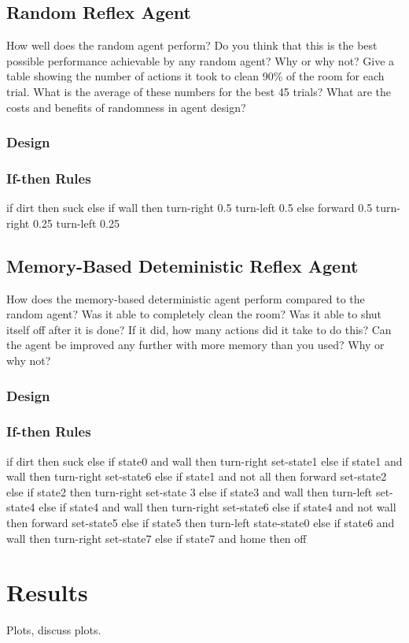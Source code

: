 \documentclass[a4paper,10pt]{article}
\begin{document}
\subsection{Random Reflex Agent}
How well does the random agent perform? Do you think that this is the best possible performance achievable by any random agent? Why or why not? Give a table showing the number of actions it took to clean 90\% of the room for each trial. What is the average of these numbers for the best 45 trials? What are the costs and benefits of randomness in agent design?
\subsubsection{Design}
\subsubsection{If-then Rules}
if dirt then suck
else if wall then turn-right 0.5 turn-left 0.5
else forward 0.5 turn-right 0.25 turn-left 0.25


\subsection{Memory-Based Deteministic Reflex Agent}
How does the memory-based deterministic agent perform compared to the random agent? Was it able to completely clean the room? Was it able to shut itself off after it is done? If it did, how many actions did it take to do this? Can the agent be improved any further with more memory than you used? Why or why not?
\subsubsection{Design}
\subsubsection{If-then Rules}
if dirt then suck
else if state0 and wall then turn-right set-state1
else if state1 and wall then turn-right set-state6
else if state1 and not all then forward set-state2
else if state2 then turn-right set-state 3
else if state3 and wall then turn-left set-state4
else if state4 and wall then turn-right set-state6
else if state4 and not wall then forward set-state5
else if state5 then turn-left state-state0
else if state6 and wall then turn-right set-state7
else if state7 and home then off


\section{Results}
Plots, discuss plots.
\end{document}
